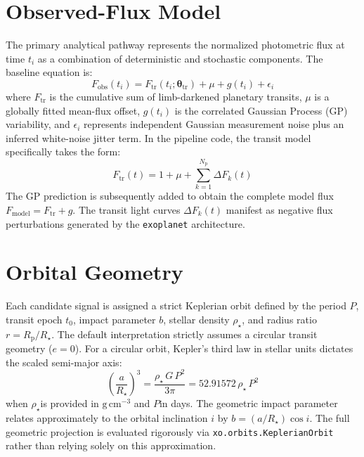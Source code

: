 \documentclass[12pt,a4paper,oneside]{report}
\newcommand{\Rstar}{\ensuremath{R_{\star}}}
\newcommand{\rhoStar}{\ensuremath{\rho_{\star}}}
\newcommand{\Rp}{\ensuremath{R_{\mathrm{p}}}}
\newcommand{\Porb}{\ensuremath{P}}
\newcommand{\tzero}{\ensuremath{t_{0}}}
\newcommand{\code}[1]{\texttt{\small #1}}
\begin{document}
\section{Observed-Flux Model}
The primary analytical pathway represents the normalized photometric flux at time \(t_i\) as a combination of deterministic and stochastic components. The baseline equation is:
\begin{equation}
  F_{\mathrm{obs}}(t_i) = F_{\mathrm{tr}}(t_i;\boldsymbol{\theta}_{\mathrm{tr}}) + \mu + g(t_i) + \epsilon_i
\end{equation}
where \(F_{\mathrm{tr}}\) is the cumulative sum of limb-darkened planetary transits, \(\mu\) is a globally fitted mean-flux offset, \(g(t_i)\) is the correlated Gaussian Process (GP) variability, and \(\epsilon_i\) represents independent Gaussian measurement noise plus an inferred white-noise jitter term. In the pipeline code, the transit model specifically takes the form:
\begin{equation}
  F_{\mathrm{tr}}(t) = 1 + \mu + \sum_{k=1}^{N_{\mathrm{p}}} \Delta F_k(t)
\end{equation}
The GP prediction is subsequently added to obtain the complete model flux \(F_{\mathrm{model}} = F_{\mathrm{tr}} + g\). The transit light curves \(\Delta F_k(t)\) manifest as negative flux perturbations generated by the \code{exoplanet} architecture.

\section{Orbital Geometry}
Each candidate signal is assigned a strict Keplerian orbit defined by the period \Porb, transit epoch \tzero, impact parameter \(b\), stellar density \rhoStar, and radius ratio \(r=\Rp/\Rstar\). The default interpretation strictly assumes a circular transit geometry (\(e=0\)). For a circular orbit, Kepler's third law in stellar units dictates the scaled semi-major axis:
\begin{equation}
  \left(\frac{a}{\Rstar}\right)^3 = \frac{\rhoStar\,G\,\Porb^2}{3\pi} = 52.91572\,\rhoStar\,\Porb^2
\end{equation}
when \rhoStar is provided in \(\mathrm{g\,cm^{-3}}\) and \Porb in days. The geometric impact parameter relates approximately to the orbital inclination \(i\) by \(b = (a/\Rstar)\cos i\). The full geometric projection is evaluated rigorously via \code{xo.orbits.KeplerianOrbit} rather than relying solely on this approximation.
\end{document}

